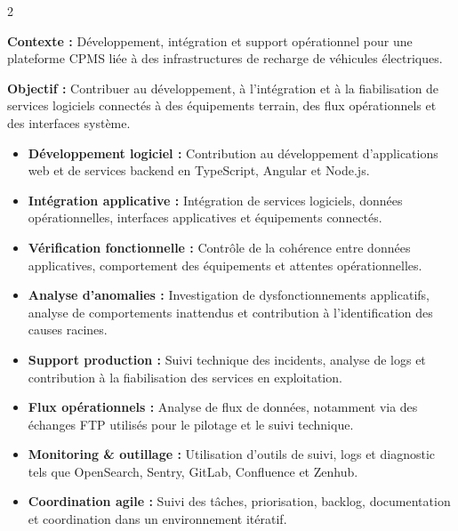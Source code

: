 \documentclass[8pt,a4paper,ragged2e,withhyper]{altacv}
\begin{document}



\makecvheader
\vspace{-0.3cm}


\begin{paracol}{2}



\textbf{Contexte :} Développement, intégration et support opérationnel pour une plateforme CPMS liée à des infrastructures de recharge de véhicules électriques.

\textbf{Objectif :} Contribuer au développement, à l’intégration et à la fiabilisation de services logiciels connectés à des équipements terrain, des flux opérationnels et des interfaces système.

\begin{itemize}
  \item \textbf{Développement logiciel :} Contribution au développement d’applications web et de services backend en TypeScript, Angular et Node.js.
  \item \textbf{Intégration applicative :} Intégration de services logiciels, données opérationnelles, interfaces applicatives et équipements connectés.
  \item \textbf{Vérification fonctionnelle :} Contrôle de la cohérence entre données applicatives, comportement des équipements et attentes opérationnelles.
  \item \textbf{Analyse d’anomalies :} Investigation de dysfonctionnements applicatifs, analyse de comportements inattendus et contribution à l’identification des causes racines.
  \item \textbf{Support production :} Suivi technique des incidents, analyse de logs et contribution à la fiabilisation des services en exploitation.
  \item \textbf{Flux opérationnels :} Analyse de flux de données, notamment via des échanges FTP utilisés pour le pilotage et le suivi technique.
  \item \textbf{Monitoring \& outillage :} Utilisation d’outils de suivi, logs et diagnostic tels que OpenSearch, Sentry, GitLab, Confluence et Zenhub.
  \item \textbf{Coordination agile :} Suivi des tâches, priorisation, backlog, documentation et coordination dans un environnement itératif.
\end{itemize}


\end{paracol}
\end{document}
